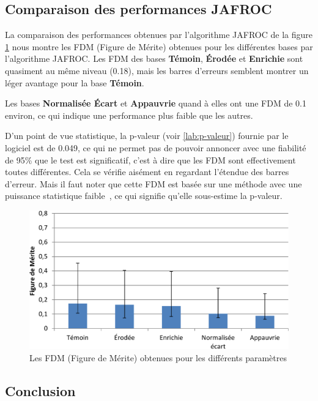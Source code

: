 \subsection{Comparaison des performances JAFROC}

La comparaison des performances obtenues par l'algorithme JAFROC \cite{chakraborty1990free} de la figure \ref{lab:fom_param} nous montre les FDM (Figure de Mérite) obtenues pour les différentes bases par l'algorithme JAFROC. Les FDM des bases \textbf{Témoin}, \textbf{Érodée} et \textbf{Enrichie} sont quasiment au même niveau (0.18), mais les barres d'erreurs semblent montrer un léger avantage pour la base \textbf{Témoin}.

Les bases \textbf{Normalisée Écart} et \textbf{Appauvrie} quand à elles ont une FDM de 0.1 environ, ce qui indique une performance plus faible que les autres.

D'un point de vue statistique, la p-valeur (voir \ref{lab:p-valeur}) fournie par le logiciel est de 0.049, ce qui ne permet pas de pouvoir annoncer avec une fiabilité de 95\% que le test est significatif, c'est à dire que les FDM sont effectivement toutes différentes. Cela se vérifie aisément en regardant l'étendue des barres d'erreur. Mais il faut noter que cette FDM est basée sur une méthode avec une puissance statistique faible~\cite{chakraborty2004observer}, ce qui signifie qu'elle sous-estime la p-valeur.

\begin{figure}[h!]
 \begin{center}
   \includegraphics[width=15cm]{images/FOM_param}
 \end{center}
 \caption{Les FDM (Figure de Mérite) obtenues pour les différents paramètres}
 \label{lab:fom_param}
\end{figure}

\subsection{Conclusion}

